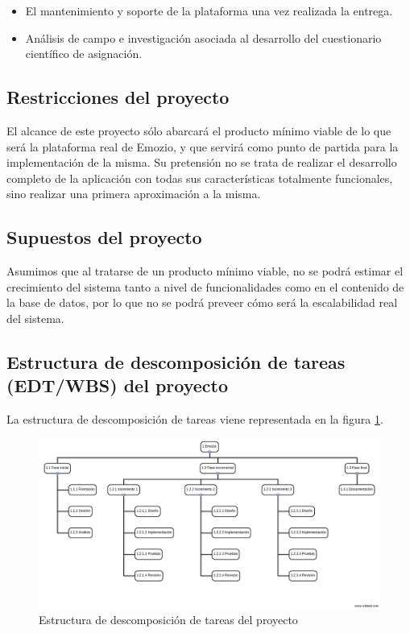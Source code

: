 \begin{itemize}
\item El mantenimiento y soporte de la plataforma una vez realizada la entrega.
\item Análisis de campo e investigación asociada al desarrollo del cuestionario científico de asignación.
\end{itemize}

\subsection{Restricciones del proyecto}
El alcance de este proyecto sólo abarcará el producto mínimo viable de lo que será la plataforma real de Emozio, y que servirá como punto de partida para la implementación de la misma. Su pretensión no se trata de realizar el desarrollo completo de la aplicación con todas sus características totalmente funcionales, sino realizar una primera aproximación a la misma.

\subsection{Supuestos del proyecto}
Asumimos que al tratarse de un producto mínimo viable, no se podrá estimar el crecimiento del sistema tanto a nivel de funcionalidades como en el contenido de la base de datos, por lo que no se podrá preveer cómo será la escalabilidad real del sistema.

\subsection{Estructura de descomposición de tareas (EDT/WBS) del proyecto}
La estructura de descomposición de tareas viene representada en la figura \ref{fig:edt}.

\begin{figure}[htbp] 
    \centering
    \includegraphics[width=1\textwidth]{figuras/edt_v1_en.png}
    \caption{Estructura de descomposición de tareas del proyecto}
    \label{fig:edt}
\end{figure}	

